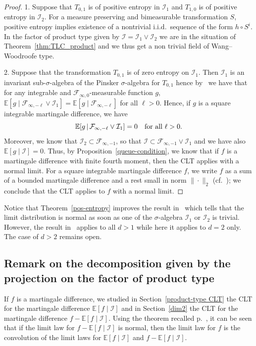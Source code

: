 \documentclass[AHL,Unicode,longabstracts,published]{cedram}
\newcommand{\bbE}{\mathbb{E}}
\newcommand{\E}[1]{\bbE\left[#1\right]}
\newcommand*\I{\mathcal{I}}
\newcommand*\F{\mathcal{F}}
\let\originalleft\left
\let\originalright\right
\renewcommand{\left}{\mathopen{}\mathclose\bgroup\originalleft}
\renewcommand{\right}{\aftergroup\egroup\originalright}
\begin{document}
\begin{proof}
1. Suppose that $T_{0,1}$ is of positive entropy in $\I_1$ and $T_{1,0}$ is of positive entropy in $\I_2$. For a measure preserving and bimeasurable transformation $S$, positive entropy implies existence of a nontrivial i.i.d.\ sequence of the form $h\circ S^i$. In the factor of product type given by $\I= \I_1\vee \I_2$ we are in the situation of Theorem~\ref{thm:TLC_product} and we thus get a non trivial field of Wang--Woodroofe type.

2. Suppose that the transformation $T_{0,1}$ is of zero entropy on $\I_1$. Then $\I_1$ is an invariant sub-$\sigma$-algebra of the Pinsker $\sigma$-algebra for $T_{0,1}$ hence by~\cite[Theorem~2]{MR928378} we have that for any integrable and $\F_{\infty,0}$-measurable function $g$, $\bbE[g\mid \F_{\infty, -\ell}\vee \I_1] = \bbE[g\mid \F_{\infty, -\ell}]$ for all $\ell >0$. Hence, if $g$ is a square integrable martingale difference, we have
\begin{equation*}
\E{g \,\middle|\,\F_{\infty, -\ell}\vee \I_1} = 0 \quad\text{for all } \ell >0.
\end{equation*}
Moreover, we know that $\I_2 \subset \F_{\infty,-1}$, so that $\I\subset \F_{\infty, -1}\vee \I_1$ and we have also $\bbE[g\mid\I]=0$. Thus, by Proposition~\ref{queue-condition}, we know that if $f$ is a martingale difference with finite fourth moment, then the CLT applies with a normal limit. For a square integrable martingale difference $f$, we write $f$ as a sum of a bounded martingale difference and a rest small in norm $\|\cdot\|_2$ (cf.~\cite[Theorem~4.2]{MR233396}); we conclude that the CLT applies to $f$ with a normal limit.
\end{proof}

Notice that Theorem~\ref{pos-entropy} improves the result in~\cite{MR3427925} which tells that the limit distribution is normal as soon as one of the $\sigma$-algebra $\I_1$ or $\I_2$ is trivial. However, the result in~\cite{MR3427925} applies to all $d>1$ while here it applies to $d=2$ only. The case of $d>2$ remains open.


\subsection{Remark on the decomposition given by the projection on the factor of product type}\label{convolution}

If $f$ is a martingale difference, we studied in Section~\ref{product-type CLT} the CLT for the martingale difference $\bbE[f \mid\I]$ and in Section~\ref{dim2} the CLT for the martingale difference $f-\bbE[f \mid\I]$. Using the theorem recalled p.~\pageref{thmdv}, it can be seen that if the limit law for $f-\bbE[f \mid\I]$ is normal, then the limit law for $f$ is the convolution of the limit laws for $\bbE[f \mid\I]$ and $f-\bbE[f \mid\I]$.
\end{document}
